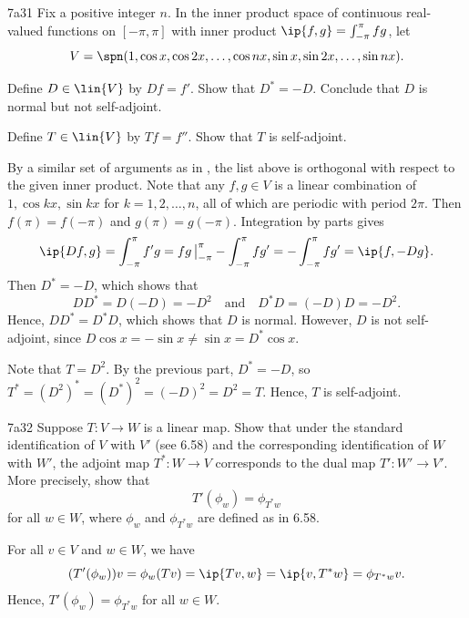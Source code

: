 \begin{exercise}{7a31}
    Fix a positive integer $n$.
    In the inner product space of continuous real-valued functions on $[-\pi, \pi]$ with inner product $\ip{f, g} = \int_{-\pi}^{\pi} fg$, let
    \[
        V = \spn(1, \cos x, \cos 2x, \ldots, \cos nx, \sin x, \sin 2x, \ldots, \sin nx).
    \]
    \begin{subexercises}
        \item Define $D \in \lin{V}$ by $Df = f'$.
        Show that $D^\ast = -D$.
        Conclude that $D$ is normal but not self-adjoint.
        \item Define $T \in \lin{V}$ by $Tf = f''$.
        Show that $T$ is self-adjoint.
    \end{subexercises}
\end{exercise}

\begin{solenum}
    \item By a similar set of arguments as in , the list above is orthogonal with respect to the given inner product.
    Note that any $f, g \in V$ is a linear combination of $1, \cos kx, \sin kx$ for $k = 1, 2, \ldots, n$, all of which are periodic with period $2\pi$.
    Then $f(\pi) = f(-\pi)$ and $g(\pi) = g(-\pi)$.
    Integration by parts gives
    \[
        \ip{Df, g} = \int_{-\pi}^{\pi} f'g = fg\,\big|_{-\pi}^{\pi} - \int_{-\pi}^{\pi} f g' = -\int_{-\pi}^{\pi} f g' = \ip{f, -Dg}.
    \]
    Then $D^\ast = -D$, which shows that
    \[
        DD^\ast = D(-D) = -D^2 \quad\text{and}\quad D^\ast D = (-D)D = -D^2.
    \]
    Hence, $DD^\ast = D^\ast D$, which shows that $D$ is normal.
    However, $D$ is not self-adjoint, since $D\cos x = -\sin x \neq \sin x = D^\ast \cos x$.
    \item Note that $T = D^2$.
    By the previous part, $D^\ast = -D$, so $T^\ast = (D^2)^\ast = (D^\ast)^2 = (-D)^2 = D^2 = T$.
    Hence, $T$ is self-adjoint.
\end{solenum}

\begin{exercise}{7a32}
    Suppose $T : V \to W$ is a linear map.
    Show that under the standard identification of $V$ with $V'$ (see 6.58) and the corresponding identification of $W$ with $W'$, the adjoint map $T^\ast : W \to V$ corresponds to the dual map $T' : W' \to V'$.
    More precisely, show that
    \[
        T'(\phi_w) = \phi_{T^\ast w}
    \]
    for all $w \in W$, where $\phi_w$ and $\phi_{T^\ast w}$ are defined as in 6.58.
\end{exercise}

\begin{sol}
    For all $v \in V$ and $w \in W$, we have
    \[
        (T'(\phi_w))v = \phi_w(Tv) = \ip{Tv, w} = \ip{v, T^\ast w} = \phi_{T^\ast w}v.
    \]
    Hence, $T'(\phi_w) = \phi_{T^\ast w}$ for all $w \in W$.
\end{sol}